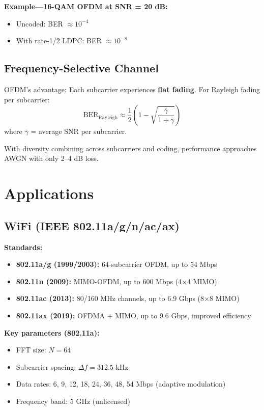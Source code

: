 \textbf{Example---16-QAM OFDM at SNR = 20 dB:}
\begin{itemize}
\item Uncoded: BER $\approx 10^{-4}$
\item With rate-1/2 LDPC: BER $\approx 10^{-8}$
\end{itemize}

\subsection{Frequency-Selective Channel}

OFDM's advantage: Each subcarrier experiences \textbf{flat fading}. For Rayleigh fading per subcarrier:
\begin{equation}
\mathrm{BER}_{\mathrm{Rayleigh}} \approx \frac{1}{2}\left(1 - \sqrt{\frac{\bar{\gamma}}{1 + \bar{\gamma}}}\right)
\end{equation}
where $\bar{\gamma}$ = average SNR per subcarrier.

With diversity combining across subcarriers and coding, performance approaches AWGN with only 2--4 dB loss.

\section{Applications}

\subsection{WiFi (IEEE 802.11a/g/n/ac/ax)}

\textbf{Standards:}
\begin{itemize}
\item \textbf{802.11a/g (1999/2003):} 64-subcarrier OFDM, up to 54 Mbps
\item \textbf{802.11n (2009):} MIMO-OFDM, up to 600 Mbps (4$\times$4 MIMO)
\item \textbf{802.11ac (2013):} 80/160 MHz channels, up to 6.9 Gbps (8$\times$8 MIMO)
\item \textbf{802.11ax (2019):} OFDMA + MIMO, up to 9.6 Gbps, improved efficiency
\end{itemize}

\textbf{Key parameters (802.11a):}
\begin{itemize}
\item FFT size: $N = 64$
\item Subcarrier spacing: $\Delta f = 312.5$ kHz
\item Data rates: 6, 9, 12, 18, 24, 36, 48, 54 Mbps (adaptive modulation)
\item Frequency band: 5 GHz (unlicensed)
\end{itemize}

